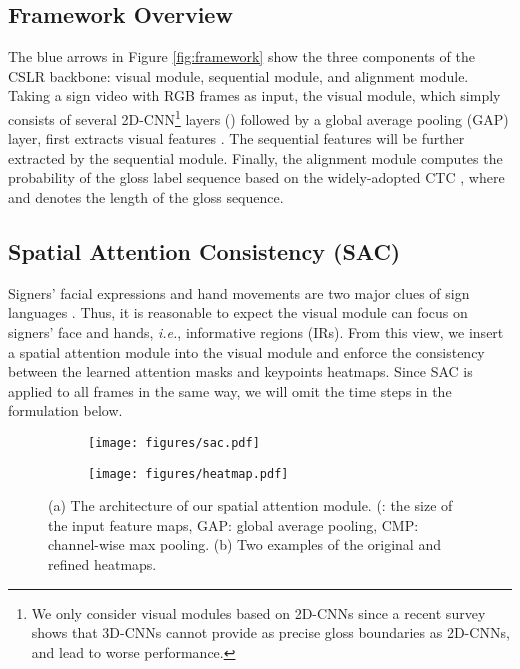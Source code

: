 \documentclass[acmsmall,screen]{acmart}
\def\ie{\emph{i.e.}} \def\Ie{\emph{I.e.}}
\begin{document}
\subsection{Framework Overview}
\label{sec:overview}
The blue arrows in Figure \ref{fig:framework} show the three components of the CSLR backbone: visual module, sequential module, and alignment module.
Taking a sign video with  RGB frames  as input, the visual module, which simply consists of several 2D-CNN\footnote{We only consider visual modules based on 2D-CNNs since a recent survey \cite{survey} shows that 3D-CNNs cannot provide as precise gloss boundaries as 2D-CNNs, and lead to worse performance.} layers () followed by a global average pooling (GAP) layer, first extracts visual features .
The sequential features  will be further extracted by the sequential module.
Finally, the alignment module computes the probability of the gloss label sequence  based on the widely-adopted CTC \cite{ctc}, where  and  denotes the length of the gloss sequence.


\subsection{Spatial Attention Consistency (SAC)}
Signers' facial expressions and hand movements are two major clues of sign languages \cite{koller2020quantitative, stmc}.
Thus, it is reasonable to expect the visual module can focus on signers' face and hands, \ie, informative regions (IRs).
From this view, we insert a spatial attention module into the visual module and enforce the consistency between the learned attention masks and keypoints heatmaps.
Since SAC is applied to all frames in the same way, we will omit the time steps in the formulation below.



\begin{figure}[t]
\begin{subfigure}[t]{.5\textwidth}
 \centering
 \texttt{[image: figures/sac.pdf]}
 \caption{}
 \label{fig:sac}
\end{subfigure}
\hfill
\begin{subfigure}[t]{.45\textwidth}
  \centering
  \texttt{[image: figures/heatmap.pdf]}
  \caption{}
  \label{fig:heatmap}
\end{subfigure}
\caption{(a) The architecture of our spatial attention module. (: the size of the input feature maps, GAP: global average pooling, CMP: channel-wise max pooling. (b) Two examples of the original and refined heatmaps.}
\end{figure}
\end{document}
